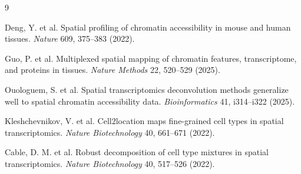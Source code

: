 \documentclass[11pt]{article}
\begin{document}
\begin{thebibliography}{9}

Deng, Y. et al. Spatial profiling of chromatin accessibility in mouse and human
tissues. \emph{Nature} 609, 375--383 (2022).

Guo, P. et al. Multiplexed spatial mapping of chromatin features, transcriptome,
and proteins in tissues. \emph{Nature Methods} 22, 520--529 (2025).

Ouologuem, S. et al. Spatial transcriptomics deconvolution methods generalize well
to spatial chromatin accessibility data. \emph{Bioinformatics} 41, i314--i322
(2025).

Kleshchevnikov, V. et al. Cell2location maps fine-grained cell types in spatial
transcriptomics. \emph{Nature Biotechnology} 40, 661--671 (2022).

Cable, D. M. et al. Robust decomposition of cell type mixtures in spatial
transcriptomics. \emph{Nature Biotechnology} 40, 517--526 (2022).

\end{thebibliography}
\end{document}
